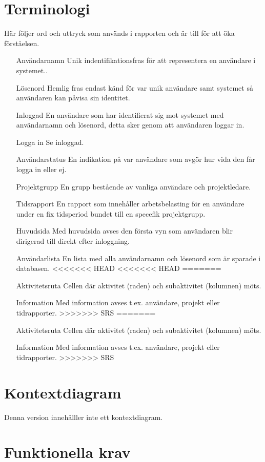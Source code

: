 \documentclass[a4paper]{article}
\begin{document}
\section{Terminologi}
Här följer ord och uttryck som används i rapporten och är till för att öka förståelsen.
\begin{itemize}
\item [Användarnamn] Unik indentifikationsfras för att representera en användare i systemet..
\item [Lösenord] Hemlig fras endast känd för var unik användare samt systemet så användaren kan påvisa sin identitet.
\item [Inloggad] En användare som har identifierat sig mot systemet med användarnamn och lösenord, detta sker genom att användaren loggar in.
\item [Logga in] Se inloggad.
\item [Användarstatus] En indikation på var användare som avgör hur vida den får logga in eller ej.
\item [Projektgrupp] En grupp bestående av vanliga användare och projektledare.
\item [Tidsrapport] En rapport som innehåller arbetsbelasting för en användare under en fix tidsperiod bundet till en specefik projektgrupp.
\item [Huvudsida] Med huvudsida avses den första vyn som användaren blir dirigerad till direkt efter inloggning. 
\item [Användarlista] En lista med alla användarnamn och lösenord som är sparade i databasen.
<<<<<<< HEAD
<<<<<<< HEAD
=======
\item [Aktivitetsruta] Cellen där aktivitet (raden) och subaktivitet (kolumnen) möts.
\item [Information] Med information avses t.ex. användare, projekt eller tidrapporter.
>>>>>>> SRS
=======
\item [Aktivitetsruta] Cellen där aktivitet (raden) och subaktivitet (kolumnen) möts.
\item [Information] Med information avses t.ex. användare, projekt eller tidrapporter.
>>>>>>> SRS
\end{itemize}
\section{Kontextdiagram}
Denna version innehålller inte ett kontextdiagram.
\section{Funktionella krav}
\end{document}
